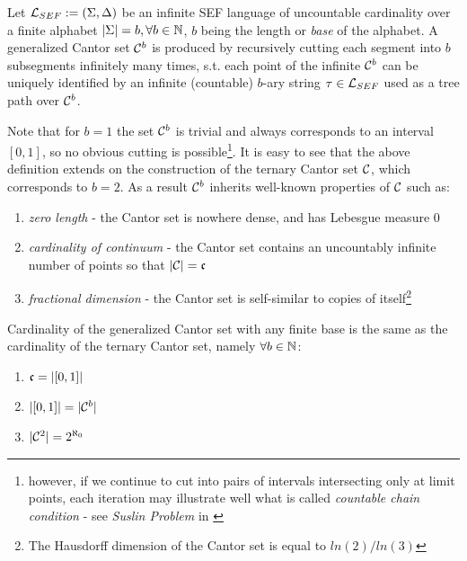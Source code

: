 \begin{definition}
  Let $\mathcal{L}_{SEF} := (\Sigma, \Delta)$ be an infinite SEF language of uncountable cardinality over a finite alphabet $|\Sigma| = b, \forall b \in \mathbb{N}$, $b$ being the length or \textit{base} of the alphabet. A generalized Cantor set $\mathcal{C}^b$ is produced by recursively cutting each segment into $b$ subsegments infinitely many times, s.t. each point of the infinite $\mathcal{C}^b$ can be uniquely identified by an infinite (countable) $b$-ary string $\tau \in \mathcal{L}_{SEF}$ used as a tree path over $\mathcal{C}^b$.
\end{definition}

Note that for $b = 1$ the set $\mathcal{C}^b$ is trivial and always corresponds to an interval $[0,1]$, so no obvious cutting is possible\footnote{however, if we continue to cut into pairs of intervals intersecting only at limit points, each iteration may illustrate well what is called \textit{countable chain condition} - see \textit{Suslin Problem} in \cite{jech2003set}}. It is easy to see that the above definition extends on the construction of the ternary Cantor set $\mathcal{C}$, which corresponds to $b = 2$. As a result $\mathcal{C}^b$ inherits well-known properties of $\mathcal{C}$ such as:

\begin{enumerate}
  \item \textit{zero length} - the Cantor set is nowhere dense, and has Lebesgue measure 0
  \item \textit{cardinality of continuum} - the Cantor set contains an uncountably infinite number of points so that $|\mathcal{C}| = \mathfrak{c}$
  \item \textit{fractional dimension} - the Cantor set is self-similar to copies of itself\footnote{The Hausdorff dimension of the Cantor set is equal to $ln(2)/ln(3)$\cite{enwiki:1071687681}}
\end{enumerate}

\begin{lemma}\label{lemma_cardinality_can}
  Cardinality of the generalized Cantor set with any finite base is the same as the cardinality of the ternary Cantor set, namely $\forall b \in \mathbb{N}$: 
  \begin{enumerate}
    \item $\mathfrak{c} = |[0,1]|$
    \item $|[0,1]| = |\mathcal{C}^b|$ 
    \item $|\mathcal{C}^2| = 2^{\aleph_0}$
  \end{enumerate}
\end{lemma}

